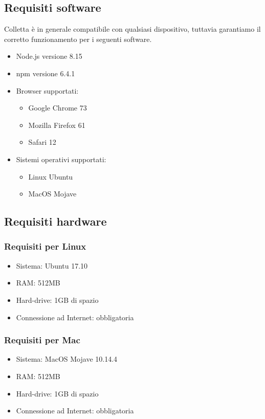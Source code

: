 \subsection{Requisiti software}
Colletta è in generale compatibile con qualsiasi dispositivo, tuttavia garantiamo il corretto funzionamento per i seguenti software.
\begin{itemize}
	\item Node.js versione 8.15
	\item npm versione 6.4.1
	\item Browser supportati:
	\begin{itemize}
		\item Google Chrome 73
		\item Mozilla Firefox 61
		\item Safari 12
	\end{itemize}
	\item Sistemi operativi supportati:
	\begin{itemize}
		\item Linux Ubuntu
		\item MacOS Mojave
	\end{itemize}
\end{itemize}
\subsection{Requisiti hardware}
\subsubsection{Requisiti per Linux}
\begin{itemize}
	\item Sistema: Ubuntu 17.10
	\item RAM: 512MB
	\item Hard-drive: 1GB di spazio
	\item Connessione ad Internet: obbligatoria
\end{itemize}
\subsubsection{Requisiti per Mac}
\begin{itemize}
	\item Sistema: MacOS Mojave 10.14.4
	\item RAM: 512MB
	\item Hard-drive: 1GB di spazio
	\item Connessione ad Internet: obbligatoria
\end{itemize}

